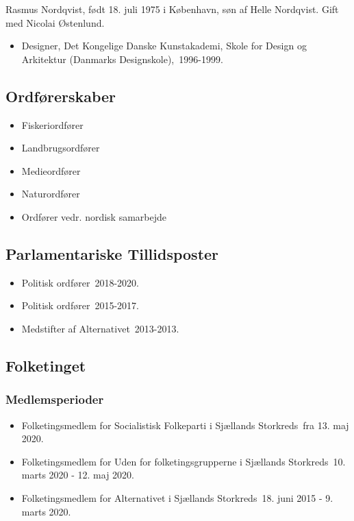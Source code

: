 \documentclass[11pt, a4paper]{awesome-cv}
\begin{document}
\makecvheader[R]
\makelettertitle
\begin{cvletter}
Rasmus Nordqvist, født 18. juli 1975 i København, søn af Helle Nordqvist. Gift med Nicolai Østenlund.

\begin{itemize}
\item Designer, Det Kongelige Danske Kunstakademi, Skole for Design og Arkitektur (Danmarks Designskole), 1996-1999.
\end{itemize}
\subsection*{Ordførerskaber}
\begin{itemize}
\item Fiskeriordfører
\item Landbrugsordfører
\item Medieordfører
\item Naturordfører
\item Ordfører vedr. nordisk samarbejde
\end{itemize}
\subsection*{Parlamentariske Tillidsposter}
\begin{itemize}
\item Politisk ordfører 2018-2020.
\item Politisk ordfører 2015-2017.
\item Medstifter af Alternativet 2013-2013.
\end{itemize}
\subsection*{Folketinget}
\subsubsection*{Medlemsperioder}
\begin{itemize}
\item Folketingsmedlem for Socialistisk Folkeparti i Sjællands Storkreds fra 13. maj 2020.
\item Folketingsmedlem for Uden for folketingsgrupperne i Sjællands Storkreds 10. marts 2020 - 12. maj 2020.
\item Folketingsmedlem for Alternativet i Sjællands Storkreds 18. juni 2015 - 9. marts 2020.
\end{itemize}

\end{cvletter}
\end{document}
